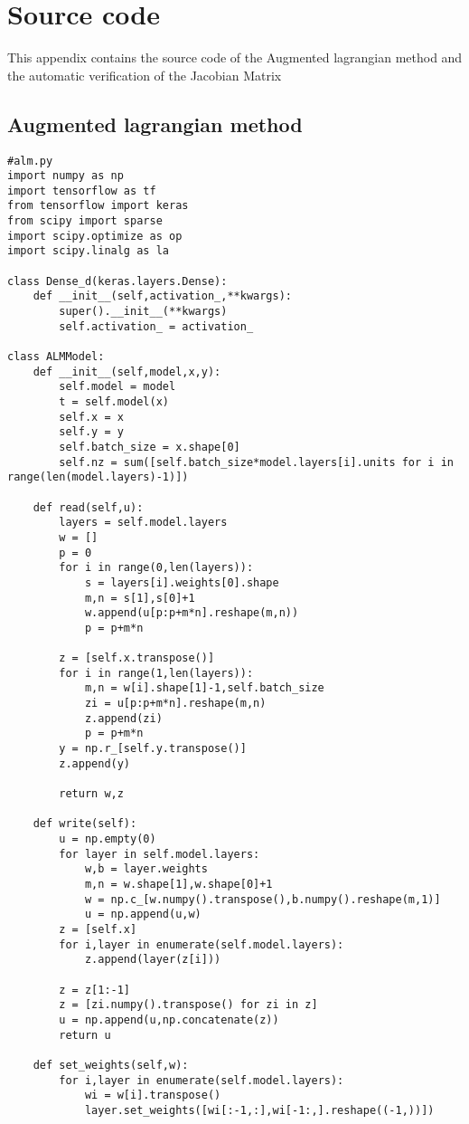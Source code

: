 \chapter{Source code}
\label{app:B}
This appendix contains the source code of the Augmented lagrangian method and the automatic verification of the Jacobian Matrix
\footnotesize
\section{Augmented lagrangian method}
\begin{verbatim}
#alm.py
import numpy as np
import tensorflow as tf
from tensorflow import keras
from scipy import sparse
import scipy.optimize as op
import scipy.linalg as la

class Dense_d(keras.layers.Dense):
    def __init__(self,activation_,**kwargs):
        super().__init__(**kwargs)
        self.activation_ = activation_

class ALMModel:
    def __init__(self,model,x,y):
        self.model = model
        t = self.model(x)
        self.x = x
        self.y = y
        self.batch_size = x.shape[0]
        self.nz = sum([self.batch_size*model.layers[i].units for i in range(len(model.layers)-1)])

    def read(self,u):
        layers = self.model.layers
        w = []
        p = 0
        for i in range(0,len(layers)):
            s = layers[i].weights[0].shape
            m,n = s[1],s[0]+1
            w.append(u[p:p+m*n].reshape(m,n))
            p = p+m*n

        z = [self.x.transpose()]
        for i in range(1,len(layers)):
            m,n = w[i].shape[1]-1,self.batch_size
            zi = u[p:p+m*n].reshape(m,n)
            z.append(zi)
            p = p+m*n
        y = np.r_[self.y.transpose()]
        z.append(y)

        return w,z
    
    def write(self):
        u = np.empty(0)
        for layer in self.model.layers:
            w,b = layer.weights
            m,n = w.shape[1],w.shape[0]+1
            w = np.c_[w.numpy().transpose(),b.numpy().reshape(m,1)]
            u = np.append(u,w)
        z = [self.x]
        for i,layer in enumerate(self.model.layers):
            z.append(layer(z[i]))

        z = z[1:-1]
        z = [zi.numpy().transpose() for zi in z] 
        u = np.append(u,np.concatenate(z))
        return u

    def set_weights(self,w):
        for i,layer in enumerate(self.model.layers):
            wi = w[i].transpose()
            layer.set_weights([wi[:-1,:],wi[-1:,].reshape((-1,))])


\end{verbatim}
